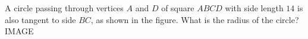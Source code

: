 A circle passing through vertices $A$ and $D$ of square $ABCD$ with side length $14$ is also tangent to side $BC$, as shown in the figure. What is the radius of the circle? IMAGE
